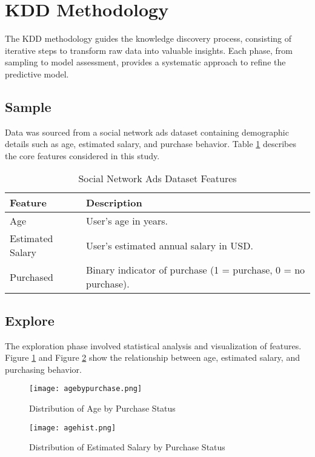 \documentclass[12pt]{article}
\begin{document}
\section{KDD Methodology}
The KDD methodology guides the knowledge discovery process, consisting of iterative steps to transform raw data into valuable insights. Each phase, from sampling to model assessment, provides a systematic approach to refine the predictive model.

\subsection{Sample}
Data was sourced from a social network ads dataset containing demographic details such as age, estimated salary, and purchase behavior. Table \ref{tab:features} describes the core features considered in this study.

\begin{table}[H]
\centering
\caption{Social Network Ads Dataset Features}
\label{tab:features}
\begin{tabular}{ll}
\toprule
\textbf{Feature} & \textbf{Description} \\
\midrule
Age & User's age in years. \\
Estimated Salary & User's estimated annual salary in USD. \\
Purchased & Binary indicator of purchase (1 = purchase, 0 = no purchase). \\
\bottomrule
\end{tabular}
\end{table}

\subsection{Explore}
The exploration phase involved statistical analysis and visualization of features. Figure \ref{fig:age_vs_purchase} and Figure \ref{fig:salary_vs_purchase} show the relationship between age, estimated salary, and purchasing behavior.

\begin{figure}[H]
    \centering
    \texttt{[image: agebypurchase.png]}
    \caption{Distribution of Age by Purchase Status}
    \label{fig:age_vs_purchase}
\end{figure}

\begin{figure}[H]
    \centering
    \texttt{[image: agehist.png]}
    \caption{Distribution of Estimated Salary by Purchase Status}
    \label{fig:salary_vs_purchase}
\end{figure}
\end{document}
